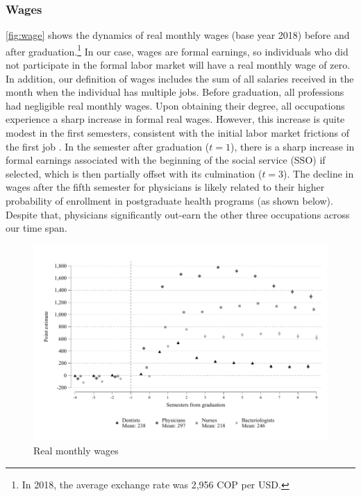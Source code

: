 \documentclass[12pt, a4paper]{article}
\begin{document}
\subsubsection{Wages}

\autoref{fig:wage} shows the dynamics of real monthly wages (base year 2018) before and after graduation.\footnote{In 2018, the average exchange rate was 2,956 COP per USD.} In our case, wages are formal earnings, so individuals who did not participate in the formal labor market will have a real monthly wage of zero. In addition, our definition of wages includes the sum of all salaries received in the month when the individual has multiple jobs. Before graduation, all professions had negligible real monthly wages. Upon obtaining their degree, all occupations experience a sharp increase in formal real wages. However, this increase is quite modest in the first semesters, consistent with the initial labor market frictions of the first job \citep{Arellano-Bover2022}. In the semester after graduation ($t=1$), there is a sharp increase in formal earnings associated with the beginning of the social service (SSO) if selected, which is then partially offset with its culmination ($t=3$). The decline in wages after the fifth semester for physicians is likely related to their higher probability of enrollment in postgraduate health programs (as shown below). Despite that, physicians significantly out-earn the other three occupations across our time span.

\begin{figure}[H]
\caption{Real monthly wages}\label{fig:wage}
\centering 
\includegraphics[width=\textwidth]{Figures/Callaway SantAnna/ES_pila_salario_r_0_all.pdf}
\end{figure}
\end{document}
